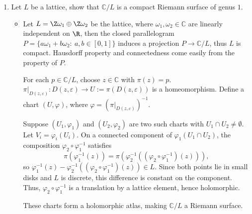 \begin{enumerate}[1]
    \item Let $L$ be a lattice, show that $\mathbb{C}/L$ is a compact Riemann surface of genus $1$.
    \begin{proofc}[解答]

        \begin{itemize}
        \item
            Let $L=\Z \omega_1 \oplus \Z\omega_2$ be the lattice, where $\omega_1, \omega_2\in \mathbb{C}$ are linearly independent on $\R$,
        then the closed parallelogram $P=\{a\omega_1 + b\omega_2: \ a, b \in [0,1]\}$ induces a projection $P\to \mathbb{C}/L$, thus $L$ is compact.
        Hausdorff property and connectedness come easily from the property of $P$.

        For each \( p \in \mathbb{C}/L \), choose \( z \in \mathbb{C} \) with \( \pi(z) = p \). \( \pi|_{D(z,\varepsilon)} : D(z,\varepsilon) \to U := \pi(D(z,\varepsilon)) \) is a homeomorphism. Define a chart \((U, \varphi)\), where \( \varphi = (\pi|_{D(z,\varepsilon)})^{-1} \).

Suppose \((U_1, \varphi_1)\) and \((U_2, \varphi_2)\) are two such charts with \( U_1 \cap U_2 \neq \emptyset \). Let \( V_i = \varphi_i(U_i) \). On a connected component of \( \varphi_1(U_1 \cap U_2) \), the composition \( \varphi_2 \circ \varphi_1^{-1} \) satisfies
\[
\pi(\varphi_1^{-1}(z)) = \pi(\varphi_2^{-1}((\varphi_2 \circ \varphi_1^{-1})(z))),
\]
so \( \varphi_1^{-1}(z) - \varphi_2^{-1}((\varphi_2 \circ \varphi_1^{-1})(z)) \in L \). Since both points lie in small disks and \( L \) is discrete, this difference is constant on the component. Thus, \( \varphi_2 \circ \varphi_1^{-1} \) is a translation by a lattice element, hence holomorphic.

These charts form a holomorphic atlas, making \( \mathbb{C}/L \) a Riemann surface.
 

\end{itemize}
\end{proofc}
\end{enumerate}
